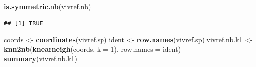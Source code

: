 \documentclass[11pt,]{article}
\newenvironment{Shaded}{\begin{snugshade}}{\end{snugshade}}
\newcommand{\KeywordTok}[1]{\textcolor[rgb]{0.13,0.29,0.53}{\textbf{#1}}}
\newcommand{\DataTypeTok}[1]{\textcolor[rgb]{0.13,0.29,0.53}{#1}}
\newcommand{\DecValTok}[1]{\textcolor[rgb]{0.00,0.00,0.81}{#1}}
\newcommand{\StringTok}[1]{\textcolor[rgb]{0.31,0.60,0.02}{#1}}
\newcommand{\NormalTok}[1]{#1}
\begin{document}
\begin{Shaded}
\begin{Highlighting}[]
\KeywordTok{is.symmetric.nb}\NormalTok{(vivref.nb)}
\end{Highlighting}
\end{Shaded}

\begin{verbatim}
## [1] TRUE
\end{verbatim}

\begin{Shaded}
\begin{Highlighting}[]
\NormalTok{coords <-}\StringTok{ }\KeywordTok{coordinates}\NormalTok{(vivref.sp)}
\NormalTok{ident <-}\StringTok{ }\KeywordTok{row.names}\NormalTok{(vivref.sp)}
\NormalTok{vivref.nb.k1  <-}\StringTok{ }\KeywordTok{knn2nb}\NormalTok{(}\KeywordTok{knearneigh}\NormalTok{(coords, }\DataTypeTok{k =} \DecValTok{1}\NormalTok{), }\DataTypeTok{row.names =}\NormalTok{ ident)}
\KeywordTok{summary}\NormalTok{(vivref.nb.k1)}
\end{Highlighting}
\end{Shaded}
\end{document}
